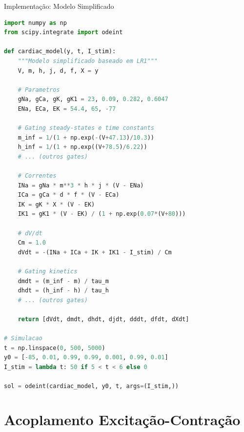 \begin{frame}[fragile]{Implementação: Modelo Simplificado}
\begin{lstlisting}[language=Python, caption=Modelo cardíaco simplificado, basicstyle=\ttfamily\footnotesize]
import numpy as np
from scipy.integrate import odeint

def cardiac_model(y, t, I_stim):
    """Modelo simplificado baseado em LR1"""
    V, m, h, j, d, f, X = y

    # Parametros
    gNa, gCa, gK, gK1 = 23, 0.09, 0.282, 0.6047
    ENa, ECa, EK = 54.4, 65, -77

    # Gating steady-states e time constants
    m_inf = 1/(1 + np.exp(-(V+47.13)/10.3))
    h_inf = 1/(1 + np.exp((V+78.5)/6.22))
    # ... (outros gates)

    # Correntes
    INa = gNa * m**3 * h * j * (V - ENa)
    ICa = gCa * d * f * (V - ECa)
    IK = gK * X * (V - EK)
    IK1 = gK1 * (V - EK) / (1 + np.exp(0.07*(V+80)))

    # dV/dt
    Cm = 1.0
    dVdt = -(INa + ICa + IK + IK1 - I_stim) / Cm

    # Gating kinetics
    dmdt = (m_inf - m) / tau_m
    dhdt = (h_inf - h) / tau_h
    # ... (outros gates)

    return [dVdt, dmdt, dhdt, djdt, dddt, dfdt, dXdt]

# Simulacao
t = np.linspace(0, 500, 5000)
y0 = [-85, 0.01, 0.99, 0.99, 0.001, 0.99, 0.01]
I_stim = lambda t: 50 if 5 < t < 6 else 0

sol = odeint(cardiac_model, y0, t, args=(I_stim,))
\end{lstlisting}
\end{frame}

\section{Acoplamento Excitação-Contração}

